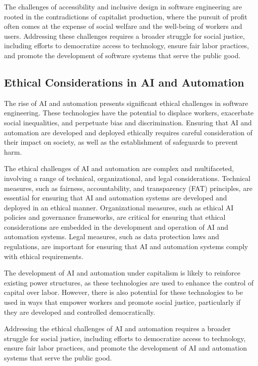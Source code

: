 \begin{refsection}
\begin{multicols}{2}
{The challenges of accessibility and inclusive design in software engineering are rooted in the contradictions of capitalist production, where the pursuit of profit often comes at the expense of social welfare and the well-being of workers and users. Addressing these challenges requires a broader struggle for social justice, including efforts to democratize access to technology, ensure fair labor practices, and promote the development of software systems that serve the public good.

\subsection{Ethical Considerations in AI and Automation}

The rise of AI and automation presents significant ethical challenges in software engineering. These technologies have the potential to displace workers, exacerbate social inequalities, and perpetuate bias and discrimination. Ensuring that AI and automation are developed and deployed ethically requires careful consideration of their impact on society, as well as the establishment of safeguards to prevent harm.

The ethical challenges of AI and automation are complex and multifaceted, involving a range of technical, organizational, and legal considerations. Technical measures, such as fairness, accountability, and transparency (FAT) principles, are essential for ensuring that AI and automation systems are developed and deployed in an ethical manner. Organizational measures, such as ethical AI policies and governance frameworks, are critical for ensuring that ethical considerations are embedded in the development and operation of AI and automation systems. Legal measures, such as data protection laws and regulations, are important for ensuring that AI and automation systems comply with ethical requirements.

The development of AI and automation under capitalism is likely to reinforce existing power structures, as these technologies are used to enhance the control of capital over labor. However, there is also potential for these technologies to be used in ways that empower workers and promote social justice, particularly if they are developed and controlled democratically.

Addressing the ethical challenges of AI and automation requires a broader struggle for social justice, including efforts to democratize access to technology, ensure fair labor practices, and promote the development of AI and automation systems that serve the public good.
}
\newpage
\end{multicols}

\end{refsection}
